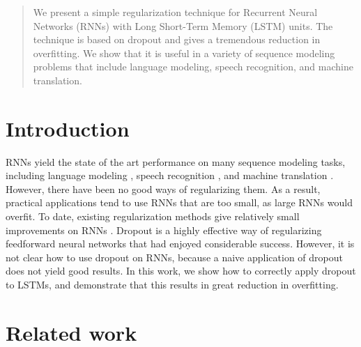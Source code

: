 \documentclass{article}
\begin{document}
 


\begin{abstract} 
  We present a simple regularization technique for Recurrent Neural
  Networks (RNNs) with Long Short-Term Memory (LSTM) units.  The
  technique is based on dropout and gives a tremendous reduction in
  overfitting.  We show that it is useful in a variety of sequence
  modeling problems that include language modeling, speech recognition, and
  machine translation.
\end{abstract} 

\section{Introduction}

RNNs yield the state of the art performance on many sequence modeling
tasks, including language modeling \cite{mikolov2012statistical}, speech recognition
\cite{graves2013speech}, and machine translation \cite{cho2014learning}.
However, there have been no good ways of regularizing them. As a
result, practical applications tend to use RNNs that are too small, as
large RNNs would overfit.  To date, existing regularization methods
give relatively small improvements on RNNs
\cite{graves2013generating}.  Dropout is a highly effective way of
regularizing feedforward neural networks
\cite{srivastava2013improving} that had enjoyed considerable
success. However, it is not clear how to use dropout on RNNs,
because a naive application of dropout does not yield good results.
In this work, we show how to correctly apply dropout to LSTMs, and
demonstrate that this results in great reduction in overfitting.

\section{Related work}
\end{document}
